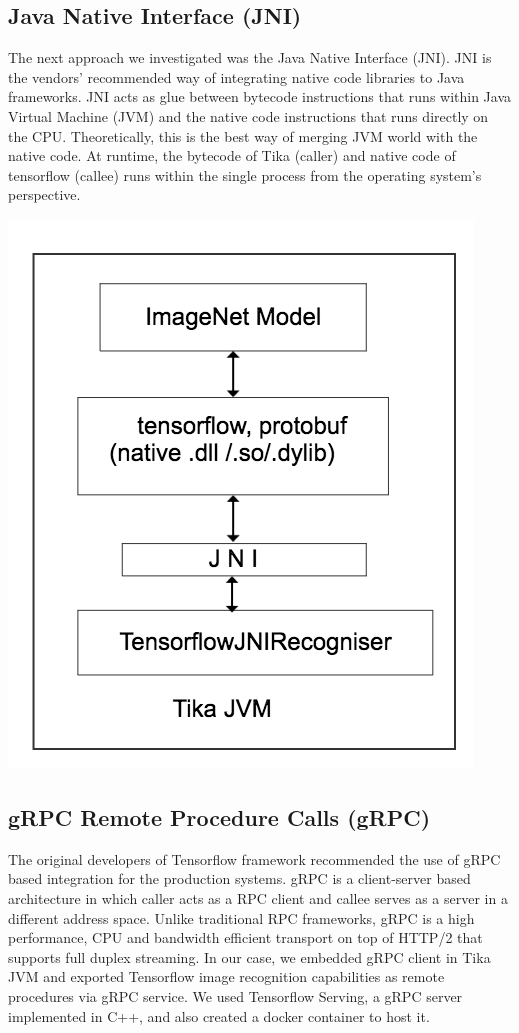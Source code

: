 \documentclass[letterpaper, 10 pt, conference]{ieeeconf}  %
\begin{document}
\subsection{Java Native Interface (JNI)} \label{sec:int-jni}
The next approach we investigated was the Java Native Interface (JNI). JNI is the vendors' recommended way of integrating native code libraries to Java frameworks\cite{}. JNI acts as glue between bytecode instructions that runs within Java Virtual Machine (JVM) and the native  code instructions that runs directly on the CPU. Theoretically, this is the best way of merging JVM world with the native code\cite{}. At runtime, the bytecode of Tika (caller) and native code of tensorflow (callee) runs within the single process from the operating system's perspective. 

\includegraphics[scale=0.40]{tika-tflow-jni-design}

\subsection{gRPC Remote Procedure Calls (gRPC)} \label{sec:int-rpc}
The original developers of Tensorflow framework recommended the use of gRPC based integration for the production systems\cite{}. gRPC is a client-server based architecture in which caller acts as a RPC client and callee serves as a server in a different address space. Unlike traditional RPC frameworks, gRPC is a high performance, CPU and bandwidth efficient transport on top of HTTP/2 that supports full duplex streaming\cite{}. In our case, we embedded gRPC client in Tika JVM and exported Tensorflow image recognition capabilities as remote procedures via gRPC service. We used Tensorflow Serving\cite{}, a gRPC\cite{} server implemented in C++, and also created a docker container to host it.
\end{document}
